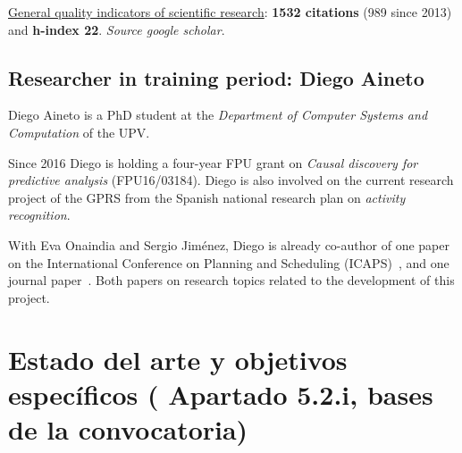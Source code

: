 \documentclass[10pt,a4paper]{paper}
\begin{document}
\underline{General quality indicators of scientific research}: {\bf 1532 citations} (989 since 2013) and {\bf h-index 22}. {\scriptsize\em Source google scholar}.


\subsection{Researcher in training period: Diego Aineto}
Diego Aineto is a PhD student at the {\em Department of Computer Systems and Computation} of the UPV.

Since 2016 Diego is holding a four-year FPU grant on {\em Causal discovery for predictive analysis} (FPU16/03184). Diego is also involved on the current research project of the GPRS from the Spanish national research plan on {\em activity recognition}.

With Eva Onaindia and Sergio Jiménez, Diego is already co-author of one paper on the International Conference on Planning and Scheduling (ICAPS)~\cite{diego-icaps18}, and one journal paper~\cite{onaindia2018common}. Both papers on research topics related to the development of this project. 


\newpage
\section{Estado del arte y objetivos específicos ( Apartado 5.2.i, bases de la convocatoria)}
\end{document}
